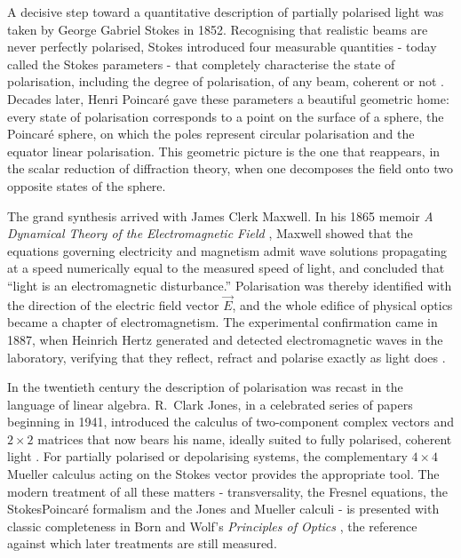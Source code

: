     A decisive step toward a quantitative description of partially polarised light was taken by
    George Gabriel Stokes in 1852. Recognising that realistic beams are never perfectly
    polarised, Stokes introduced four measurable quantities - today called the Stokes
    parameters - that completely characterise the state of polarisation, including the degree
    of polarisation, of any beam, coherent or not \cite{stokes1852composition}. Decades later,
    Henri Poincaré gave these parameters a beautiful geometric home: every state of
    polarisation corresponds to a point on the surface of a sphere, the Poincaré sphere, on
    which the poles represent circular polarisation and the equator linear polarisation. This
    geometric picture is the one that reappears, in the scalar reduction of diffraction theory,
    when one decomposes the field onto two opposite states of the sphere.

    The grand synthesis arrived with James Clerk Maxwell. In his 1865 memoir \textit{A
    Dynamical Theory of the Electromagnetic Field} \cite{maxwell1865dynamical}, Maxwell showed
    that the equations governing electricity and magnetism admit wave solutions propagating at
    a speed numerically equal to the measured speed of light, and concluded that ``light is an
    electromagnetic disturbance.'' Polarisation was thereby identified with the direction of
    the electric field vector $\vec{E}$, and the whole edifice of physical optics became a
    chapter of electromagnetism. The experimental confirmation came in 1887, when Heinrich
    Hertz generated and detected electromagnetic waves in the laboratory, verifying that they
    reflect, refract and polarise exactly as light does \cite{hertz1893electric}.

    In the twentieth century the description of polarisation was recast in the language of
    linear algebra. R.\ Clark Jones, in a celebrated series of papers beginning in 1941,
    introduced the calculus of two-component complex vectors and $2\times2$ matrices that now
    bears his name, ideally suited to fully polarised, coherent light \cite{jones1941new}. For
    partially polarised or depolarising systems, the complementary $4\times4$ Mueller calculus
    acting on the Stokes vector provides the appropriate tool. The modern treatment of all
    these matters - transversality, the Fresnel equations, the StokesPoincaré formalism and
    the Jones and Mueller calculi - is presented with classic completeness in Born and Wolf's
    \textit{Principles of Optics} \cite{born1999principles}, the reference against which later
    treatments are still measured.

